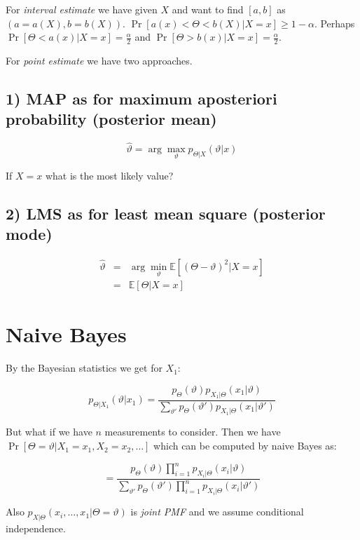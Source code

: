 For \textit{interval estimate} we have given $X$ and want to find $[a,b]$ as $(a = a(X), b = b(X))$. $\Pr[a(x) < \Theta < b(X) \vert X = x] \geq 1 - \alpha$. Perhaps $\Pr[\Theta < a(x) \vert X =x ] = \frac{\alpha}{2}$ and $\Pr[\Theta > b(x) \vert X =x ] = \frac{\alpha}{2}$.

For \textit{point estimate} we have two approaches.

\subsection{1) MAP as for maximum aposteriori probability (posterior mean)}

$$
\hat{\vartheta} = \arg\max_{\vartheta} p_{\Theta \vert X} (\vartheta \vert x)
$$

If $X = x$ what is the most likely value?

\subsection{2) LMS as for least mean square (posterior mode)}

$$
\begin{array}{rcl}
\hat{\vartheta} & = & \arg\min_{\vartheta} \mathbb{E}[(\Theta - \vartheta)^{2} \vert X = x] \\
& = & \mathbb{E}[\Theta \vert X = x]
\end{array}
$$

\section{Naive Bayes}

By the Bayesian statistics we get for $X_{1}$:

$$
p_{\Theta\vert X_{1}} (\vartheta \vert x_{1}) = \frac{p_{\Theta}(\vartheta) p_{X_{1} \vert\Theta}(x_{1} \vert \vartheta)}{\sum_{\vartheta'} p_{\Theta}(\vartheta')p_{X_{1}\vert\Theta}(x_{1} \vert \vartheta')}
$$

But what if we have $n$ measurements to consider. Then we have $\Pr[\Theta = \vartheta \vert X_{1} = x_{1}, X_{2} = x_{2}, \dots]$ which can be computed by naive Bayes as:

$$
= \frac{p_{\Theta}(\vartheta) \prod_{i=1}^{n}p_{X_{i}\vert \Theta} (x_{i} \vert \vartheta)}{\sum_{\vartheta'} p_{\Theta}(\vartheta')\prod_{i=1}^{n}p_{X_{i}\vert \Theta} (x_{i} \vert \vartheta')}
$$

Also $p_{X \vert \Theta}(x_{i}, \dots, x_{1} \vert \Theta = \vartheta)$ is \textit{joint PMF} and we assume conditional independence.

